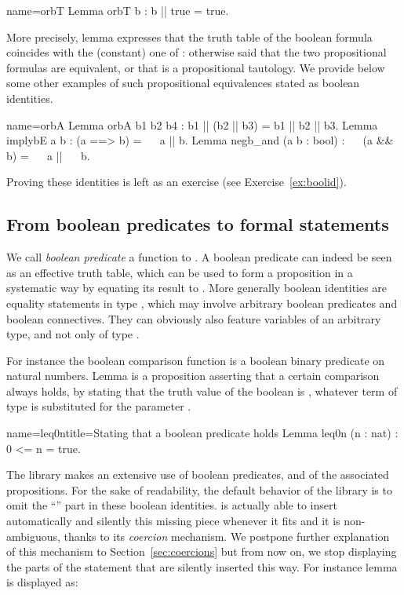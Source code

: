 \begin{coq}{name=orbT}{}
Lemma orbT b : b || true = true.
\end{coq}

More precisely, lemma 
expresses that the truth table of the boolean formula 
coincides with the (constant) one of : otherwise said that the
two propositional formulas are equivalent, or that  is a
propositional tautology. We provide below some other examples of such
propositional equivalences stated as boolean identities.

\begin{coq}{name=orbA}{}
Lemma orbA b1 b2 b4 : b1 || (b2 || b3) = b1 || b2 || b3.
Lemma implybE a b : (a ==> b) = ~~ a || b.
Lemma negb_and (a b : bool) : ~~ (a && b) = ~~ a || ~~ b.
\end{coq}
Proving these identities is left as an exercise (see
Exercise~\ref{ex:boolid}).


\subsection{From boolean predicates to formal statements}
\label{sec:bstatements}

We call \emph{boolean predicate} a function to . A boolean
predicate can indeed be seen as an effective truth table, which can be
used to form a proposition in a systematic way by equating its result
to . More generally boolean identities are equality statements
in type , which may involve arbitrary boolean predicates and boolean
connectives. They can obviously also feature variables of an arbitrary
type, and not only of type .

For instance the boolean comparison function
 is a boolean binary predicate on
natural numbers. Lemma  is a proposition asserting that a
certain comparison always holds, by stating that the truth value of
the boolean  is , whatever term  of type 
is substituted for the parameter .

\begin{coq}{name=leq0n}{title=Stating that a boolean predicate holds}
Lemma leq0n (n : nat) : 0 <= n = true.
\end{coq}

The \mcbMC{} library makes an extensive use of boolean predicates, and
of the associated propositions. For the sake of readability, the
default behavior of the  \mcbMC{} library is to omit the ``''
part in these boolean identities. \Coq{} is actually able to insert
automatically and silently this missing piece whenever it fits and
it is non-ambiguous, thanks to its \emph{coercion} mechanism. We
postpone further explanation of this mechanism to
Section~\ref{sec:coercions} but from now on, we stop displaying the
 parts of the statement that are silently inserted this
way. For instance lemma  is displayed as:

